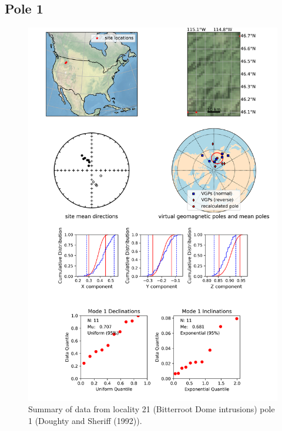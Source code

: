 \documentclass{article}
\begin{document}
\subsection{Pole 1}


\begin{figure}[H]
\centering
\includegraphics[width=5 in]{./21/1/pole_summary.png}
\caption{Summary of data from locality 21 (Bitterroot Dome intrusions) pole 1 (Doughty and Sheriff (1992)).}
\end{figure}
\end{document}
